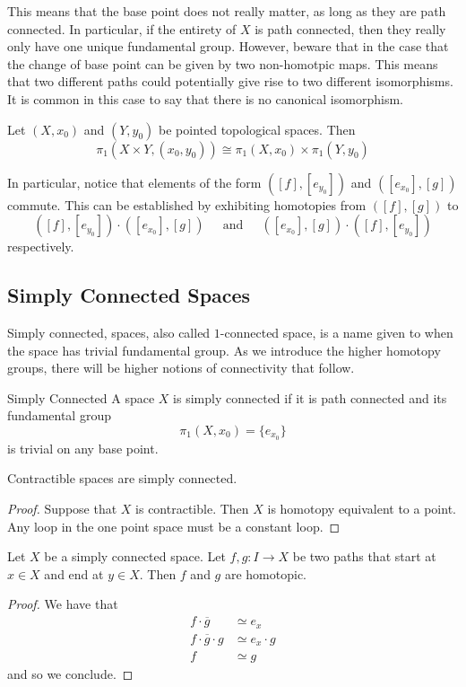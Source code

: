 \documentclass[a4paper]{article}
\begin{document}
This means that the base point does not really matter, as long as they are path connected. In particular, if the entirety of $X$ is path connected, then they really only have one unique fundamental group. However, beware that in the case that the change of base point can be given by two non-homotpic maps. This means that two different paths could potentially give rise to two different isomorphisms. It is common in this case to say that there is no canonical isomorphism. \\

\begin{prp}{}{} Let $(X,x_0)$ and $(Y,y_0)$ be pointed topological spaces. Then $$\pi_1(X\times Y,(x_0,y_0))\cong\pi_1(X,x_0)\times\pi_1(Y,y_0)$$
\end{prp}

In particular, notice that elements of the form $([f],[e_{y_0}])$ and $([e_{x_0}],[g])$ commute. This can be established by exhibiting homotopies from $([f],[g])$ to $$([f],[e_{y_0}])\cdot([e_{x_0}],[g])\;\;\;\;\text{ and }\;\;\;\;([e_{x_0}],[g])\cdot([f],[e_{y_0}])$$ respectively. 

\subsection{Simply Connected Spaces}
Simply connected, spaces, also called $1$-connected space, is a name given to when the space has trivial fundamental group. As we introduce the higher homotopy groups, there will be higher notions of connectivity that follow. 

\begin{defn}{Simply Connected}{} A space $X$ is simply connected if it is path connected and its fundamental group $$\pi_1(X,x_0)=\{e_{x_0}\}$$ is trivial on any base point. 
\end{defn}

\begin{prp}{}{} Contractible spaces are simply connected. 
\begin{proof}
Suppose that $X$ is contractible. Then $X$ is homotopy equivalent to a point. Any loop in the one point space must be a constant loop. 
\end{proof}
\end{prp}

\begin{lmm}{}{} Let $X$ be a simply connected space. Let $f,g:I\to X$ be two paths that start at $x\in X$ and end at $y\in X$. Then $f$ and $g$ are homotopic. 
\begin{proof}
We have that 
\begin{align*}
f\cdot\overline{g}&\simeq e_x\\
f\cdot\overline{g}\cdot g&\simeq e_x\cdot g\\
f&\simeq g
\end{align*}
and so we conclude. 
\end{proof}
\end{lmm}
\end{document}
